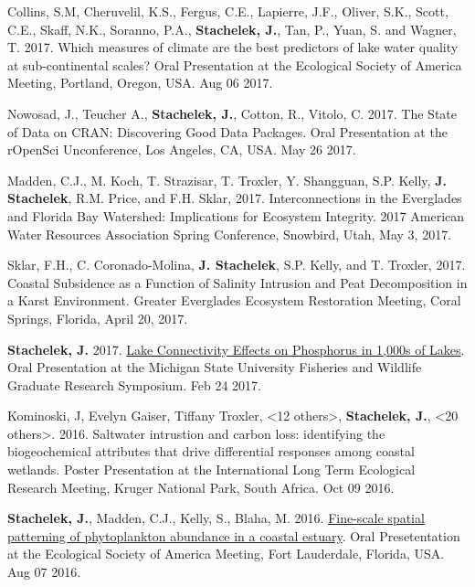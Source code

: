 \documentclass[11pt]{article}
\makeatletter
\newlength{\bibhang}
\newlength{\bibsep}
 {\@listi \global\bibsep\itemsep \global\advance\bibsep by\parsep}
\newenvironment{bibenum*}
  {\renewcommand\labelenumi{[\theenumi]}%
   \etaremune[
     topsep=0pt,
     itemsep=\bibsep,
     parsep=0pt,partopsep=0pt,
     itemindent=-\bibhang,
     leftmargin={\bibhang+\widthof{[999]}}]}
  {\endetaremune}
\makeatother
\begin{document}
\begin{bibenum*}
  \item Collins, S.M, Cheruvelil, K.S., Fergus, C.E., Lapierre, J.F., Oliver, S.K., Scott, C.E., Skaff, N.K., Soranno, P.A., \textbf{Stachelek, J.}, Tan, P., Yuan, S. and Wagner, T. 2017. Which measures of climate are the best predictors of lake water quality at sub-continental scales? Oral Presentation at the Ecological Society of America Meeting, Portland, Oregon, USA. Aug 06 2017.

  \item Nowosad, J., Teucher A., \textbf{Stachelek, J.}, Cotton, R., Vitolo, C. 2017. The State of Data on CRAN: Discovering Good Data Packages. Oral Presentation at the rOpenSci Unconference, Los Angeles, CA, USA. May 26 2017.

  \item Madden, C.J., M. Koch, T. Strazisar, T. Troxler, Y. Shangguan, S.P. Kelly, \textbf{J. Stachelek}, R.M. Price, and F.H. Sklar, 2017. Interconnections in the Everglades and Florida Bay Watershed: Implications for Ecosystem Integrity. 2017 American Water Resources Association Spring Conference, Snowbird, Utah, May 3, 2017.

  \item Sklar, F.H., C. Coronado-Molina, \textbf{J. Stachelek}, S.P. Kelly, and T. Troxler, 2017. Coastal Subsidence as a Function of Salinity Intrusion and Peat Decomposition in a Karst Environment. Greater Everglades Ecosystem Restoration Meeting, Coral Springs, Florida, April 20, 2017.

  \item \textbf{Stachelek, J.} 2017. \href{https://doi.org/10.6084/m9.figshare.8187038.v1}{Lake Connectivity Effects on Phosphorus in 1,000s of Lakes}. Oral Presentation at the Michigan State University Fisheries and Wildlife Graduate Research Symposium. Feb 24 2017.

  \item Kominoski, J, Evelyn Gaiser, Tiffany Troxler, <12 others>, \textbf{Stachelek, J.}, <20 others>. 2016. Saltwater intrustion and carbon loss: identifying the biogeochemical attributes that drive differential responses among coastal wetlands. Poster Presentation at the International Long Term Ecological Research Meeting, Kruger National Park, South Africa. Oct 09 2016.

  \item \textbf{Stachelek, J.}, Madden, C.J., Kelly, S., Blaha, M. 2016. \href{http://doi.org/10.6084/m9.figshare.2775322.v4}{Fine-scale spatial patterning of phytoplankton abundance in a coastal estuary}. Oral Presetentation at the Ecological Society of America Meeting, Fort Lauderdale, Florida, USA. Aug 07 2016. 
  

\end{bibenum*}
\end{document}
